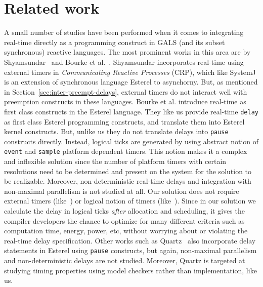 \section{Related work}
\label{sec:related-work}


A small number of studies have been performed when it comes to
integrating real-time directly as a programming construct in GALS (and
its subset synchronous) reactive languages. The most prominent works in
this area are by Shyamsundar~\cite{rsh94} and Bourke et
al.~\cite{Bourke2009a}. Shyamsundar incorporates real-time using
external timers in \textit{Communicating Reactive Processes} (CRP),
which like SystemJ is an extension of synchronous language Esterel to
asynchorny. But, as mentioned in Section~\ref{sec:inter-preempt-delays},
external timers do not interact well with preemption constructs in these
languages. Bourke et al. introduce real-time as first class constructs
in the Esterel language. They like us provide real-time \texttt{delay}
as first class Esterel programming constructs, and translate them into
Esterel kernel constructs. But, unlike us they do not translate delays
into \texttt{pause} constructs directly. Instead, logical ticks are
generated by using abstract notion of \texttt{event} and \texttt{sample}
platform dependent timers. This notion makes it a complex and inflexible
solution since the number of platform timers with certain resolutions
need to be determined and present on the system for the solution to be
realizable. Moreover, non-deterministic real-time delays and integration
with non-maximal parallelism is not studied at all. Our solution does
not require external timers (like~\cite{rsh94}) or logical notion of
timers (like~\cite{Bourke2009a}). Since in our solution we calculate the
delay in logical ticks \textit{after} allocation and scheduling, it
gives the compiler developers the chance to optimize for many different
criteria such as computation time, energy, power, etc, without worrying
about or violating the real-time delay specification. Other works such
as Quartz~\cite{glog02} also incorporate delay statements in Esterel
using \texttt{pause} constructs, but again, non-maximal parallelism and
non-deterministic delays are not studied. Moreover, Quartz is targeted
at studying timing properties using model checkers rather than
implementation, like us.




